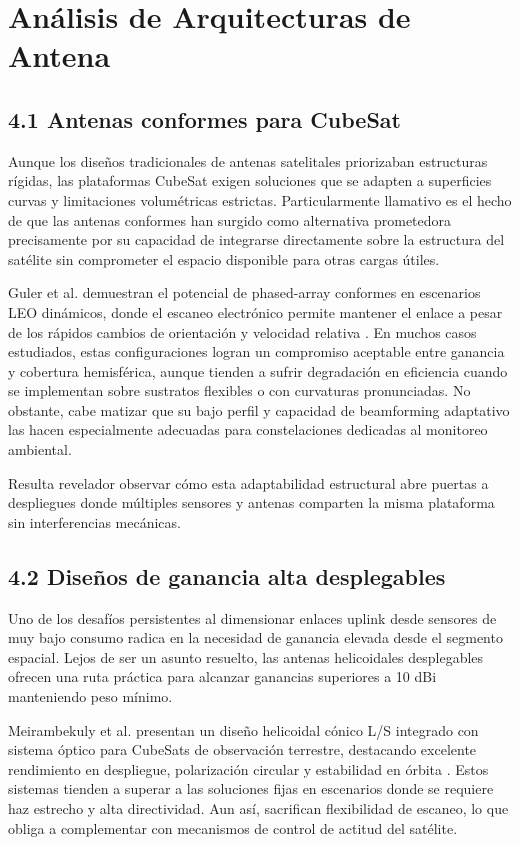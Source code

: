 \section{Análisis de Arquitecturas de Antena}

\subsection{4.1 Antenas conformes para CubeSat}

Aunque los diseños tradicionales de antenas satelitales priorizaban estructuras rígidas, las plataformas CubeSat exigen soluciones que se adapten a superficies curvas y limitaciones volumétricas estrictas. Particularmente llamativo es el hecho de que las antenas conformes han surgido como alternativa prometedora precisamente por su capacidad de integrarse directamente sobre la estructura del satélite sin comprometer el espacio disponible para otras cargas útiles.

Guler et al. demuestran el potencial de phased-array conformes en escenarios LEO dinámicos, donde el escaneo electrónico permite mantener el enlace a pesar de los rápidos cambios de orientación y velocidad relativa \cite{Guler2025}. En muchos casos estudiados, estas configuraciones logran un compromiso aceptable entre ganancia y cobertura hemisférica, aunque tienden a sufrir degradación en eficiencia cuando se implementan sobre sustratos flexibles o con curvaturas pronunciadas. No obstante, cabe matizar que su bajo perfil y capacidad de beamforming adaptativo las hacen especialmente adecuadas para constelaciones dedicadas al monitoreo ambiental.

Resulta revelador observar cómo esta adaptabilidad estructural abre puertas a despliegues donde múltiples sensores y antenas comparten la misma plataforma sin interferencias mecánicas.

\subsection{4.2 Diseños de ganancia alta desplegables}

Uno de los desafíos persistentes al dimensionar enlaces uplink desde sensores de muy bajo consumo radica en la necesidad de ganancia elevada desde el segmento espacial. Lejos de ser un asunto resuelto, las antenas helicoidales desplegables ofrecen una ruta práctica para alcanzar ganancias superiores a 10 dBi manteniendo peso mínimo.

Meirambekuly et al. presentan un diseño helicoidal cónico L/S integrado con sistema óptico para CubeSats de observación terrestre, destacando excelente rendimiento en despliegue, polarización circular y estabilidad en órbita \cite{Meirambekuly2023}. Estos sistemas tienden a superar a las soluciones fijas en escenarios donde se requiere haz estrecho y alta directividad. Aun así, sacrifican flexibilidad de escaneo, lo que obliga a complementar con mecanismos de control de actitud del satélite.

